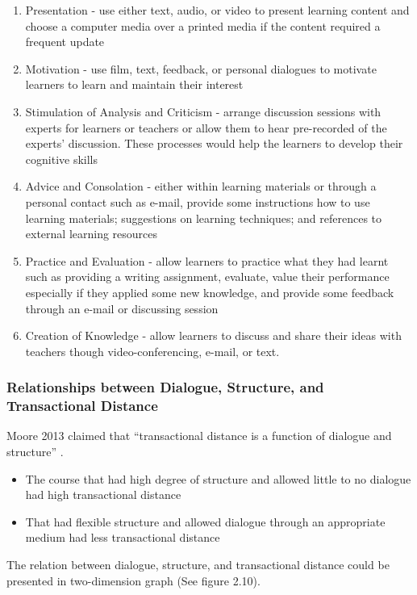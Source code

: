 \begin{enumerate}
\item Presentation - use either text, audio, or video to present learning content and choose a computer media over a printed media if the content required a frequent update

\item Motivation - use film, text, feedback, or personal dialogues to motivate learners to learn and maintain their interest

\item Stimulation of Analysis and Criticism - arrange discussion sessions with experts for learners or teachers or allow them to hear pre-recorded of the experts' discussion. These processes would help the learners to develop their cognitive skills

\item Advice and Consolation - either within learning materials or through a personal contact such as e-mail, provide some instructions how to use learning materials; suggestions on learning techniques; and references to external learning resources 

\item Practice and Evaluation - allow learners to practice what they had learnt such as providing a writing assignment, evaluate, value their performance especially if they applied some new knowledge, and provide some feedback through an e-mail or discussing session 

\item Creation of Knowledge - allow learners to discuss and share their ideas with teachers though video-conferencing, e-mail, or text. 
\end{enumerate}


\subsubsection{Relationships between Dialogue, Structure, and Transactional Distance} 

Moore 2013 \cite{moore2013handbook} claimed that ``transactional distance is a function of dialogue and structure'' \cite[pp. 71]{moore2013handbook}. 
\begin{itemize}
\item The course that had high degree of structure and allowed little to no dialogue had high transactional distance
\item That had flexible structure and allowed dialogue through an appropriate medium had less transactional distance
\end{itemize}
The relation between dialogue, structure, and transactional distance could be presented in two-dimension graph (See figure 2.10). 

